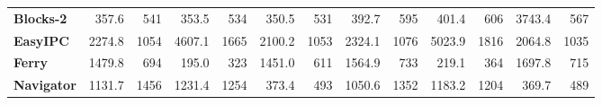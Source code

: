 \begin{table}[tpb]
{\begin{tabular}{|l|rr|rr|rr|rr|rr|rr|}
\textbf{Blocks-2} & 357.6 & 541 & 353.5 & 534 & 350.5 & 531 & 392.7 & 595 & 401.4 & 606 & 3743.4 & 567 \\ \cline{1-1}
\textbf{EasyIPC} & 2274.8 & 1054 & 4607.1 & 1665 & 2100.2 & 1053 & 2324.1 & 1076 & 5023.9 & 1816 & 2064.8 & 1035 \\ \cline{1-1}
\textbf{Ferry} & 1479.8 & 694 & 195.0 & 323 & 1451.0 & 611 & 1564.9 & 733 & 219.1 & 364 & 1697.8 & 715 \\ \cline{1-1}
\textbf{Navigator} & 1131.7 & 1456 & 1231.4 & 1254 & 373.4 & 493 & 1050.6 & 1352 & 1183.2 & 1204 & 369.7 & 489 \\ \hline
\end{tabular}%
}
\label{tab:proctime1}
\end{table}


\begin{table}[tpb]
\setlength\extrarowheight{4pt}
\small
\caption{Total processing time in \textbf{seconds} ($Q$) for all Intervention problems in set 1, 2 and 3 and the mean processing time in \textbf{milliseconds} for each incrementally revealed observation ($\overline{Q}$) for predicting intervention with logistic regression and k-nearest neighbor classifiers using features from the Intervention Graph and the Plan Space Sampling methods}
\end{table}
